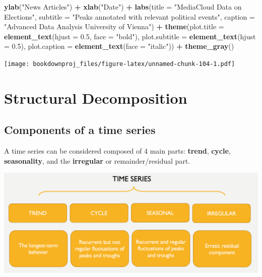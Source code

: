 \documentclass[
]{article}
\newenvironment{Shaded}{\begin{snugshade}}{\end{snugshade}}
\newcommand{\DataTypeTok}[1]{\textcolor[rgb]{0.13,0.29,0.53}{#1}}
\newcommand{\FloatTok}[1]{\textcolor[rgb]{0.00,0.00,0.81}{#1}}
\newcommand{\KeywordTok}[1]{\textcolor[rgb]{0.13,0.29,0.53}{\textbf{#1}}}
\newcommand{\NormalTok}[1]{#1}
\newcommand{\OperatorTok}[1]{\textcolor[rgb]{0.81,0.36,0.00}{\textbf{#1}}}
\newcommand{\StringTok}[1]{\textcolor[rgb]{0.31,0.60,0.02}{#1}}
\begin{document}
\begin{Shaded}
\begin{Highlighting}[]
\StringTok{  }\KeywordTok{ylab}\NormalTok{(}\StringTok{"News Articles"}\NormalTok{) }\OperatorTok{+}
\StringTok{  }\KeywordTok{xlab}\NormalTok{(}\StringTok{"Date"}\NormalTok{) }\OperatorTok{+}
\StringTok{  }\KeywordTok{labs}\NormalTok{(}\DataTypeTok{title =} \StringTok{"MediaCloud Data on Elections"}\NormalTok{,}
       \DataTypeTok{subtitle =} \StringTok{"Peaks annotated with relevant political events"}\NormalTok{,}
       \DataTypeTok{caption =} \StringTok{"Advanced Data Analysis}
\StringTok{                  University of Vienna"}\NormalTok{) }\OperatorTok{+}
\StringTok{  }\KeywordTok{theme}\NormalTok{(}\DataTypeTok{plot.title =} \KeywordTok{element_text}\NormalTok{(}\DataTypeTok{hjust =} \FloatTok{0.5}\NormalTok{, }\DataTypeTok{face =} \StringTok{"bold"}\NormalTok{),}
        \DataTypeTok{plot.subtitle =} \KeywordTok{element_text}\NormalTok{(}\DataTypeTok{hjust =} \FloatTok{0.5}\NormalTok{),}
        \DataTypeTok{plot.caption =} \KeywordTok{element_text}\NormalTok{(}\DataTypeTok{face =} \StringTok{"italic"}\NormalTok{)) }\OperatorTok{+}
\StringTok{  }\KeywordTok{theme_gray}\NormalTok{()}
\end{Highlighting}
\end{Shaded}

\texttt{[image: bookdownproj\_files/figure-latex/unnamed-chunk-104-1.pdf]}

\hypertarget{structural-decomposition}{%
\section{Structural Decomposition}\label{structural-decomposition}}

\hypertarget{components-of-a-time-series}{%
\subsection{Components of a time series}\label{components-of-a-time-series}}

A time series can be considered composed of 4 main parts: \textbf{trend}, \textbf{cycle}, \textbf{seasonality}, and the \textbf{irregular} or remainder/residual part.

\includegraphics[width=32.25in]{images/Structure}
\end{document}
